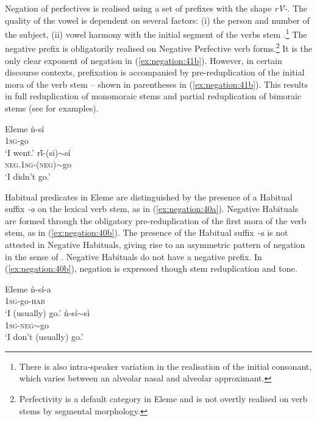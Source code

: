 \documentclass[output=paper,hidelinks]{langscibook}
\begin{document}
\largerpage
Negation of perfectives is realised using a set of prefixes with the shape \mbox{\emph{rV́-}.} The quality of the vowel is dependent on several factors: (i) the person and number of the subject, (ii) vowel harmony with the initial segment of the verbs stem \citep [280] {Bond2016}.\footnote{There is also intra-speaker variation in the realisation of the initial consonant, which varies between an alveolar nasal and alveolar approximant.} The negative prefix is obligatorily realised on Negative Perfective verb forms.\footnote{Perfectivity is a default category in Eleme and is not overtly realised on verb stems by segmental morphology.} It is the only clear exponent of negation in (\ref{ex:negation:41b}). However, in certain discourse contexts, prefixation is accompanied by pre-reduplication of the initial mora of the verb stem -- shown in parentheses in (\ref{ex:negation:41b}). This results in full reduplication of monomoraic stems and partial reduplication of bimoraic stems (see \citealt [281] {Bond2016} for examples).

\ea\label{ex:negation:41}Eleme \citep [281] {Bond2016}
\ea\label{ex:negation:41a}
\gll ǹ-sí \\
1\textsc{sg}-go\\
\glt`I went.'		
\ex\label{ex:negation:41b}
\gll rĩ́-(si)$\sim$sí \\
\textsc{neg.1sg-(neg)}$\sim$go\\
\glt`I didn’t go.'
\z\z

Habitual predicates in Eleme are distinguished by the presence of a Habitual suffix \emph{-a} on the lexical verb stem, as in (\ref{ex:negation:40a}). Negative Habituals are formed through the obligatory pre-reduplication of the first mora of the verb stem, as in (\ref{ex:negation:40b}). The presence of the Habitual suffix \emph{-a} is not attested in Negative Habituals, giving rise to an asymmetric pattern of negation in the sense of \citet {Miestamo:05}. Negative Habituals do not have a negative prefix. In (\ref{ex:negation:40b}), negation is expressed though stem reduplication and tone.

\ea\label{ex:negation:40}Eleme \citep [278]{Bond2016}
\ea\label{ex:negation:40a}
\gll ǹ-sí-a\\
1\textsc{sg}-go-\textsc{hab}\\
\glt`I (usually) go.'
\ex\label{ex:negation:40b}
\gll ǹ-sí$\sim$sì\\
1\textsc{sg-neg}$\sim$go\\
\glt`I don't (usually) go.'
\z\z
\end{document}
